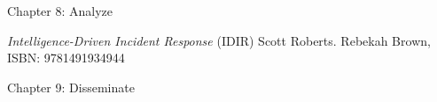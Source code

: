\documentclass[Screen16to9,17pt]{foils}
\begin{document}
\begin{quote}

\end{quote}

\begin{list2}
\item Chapter 8: Analyze
\end{list2}


\emph{Intelligence-Driven Incident Response} (IDIR)
 Scott Roberts. Rebekah Brown, ISBN: 9781491934944

\begin{quote}

\end{quote}

\begin{list2}
\item Chapter 9: Disseminate
\end{list2}




\end{document}
